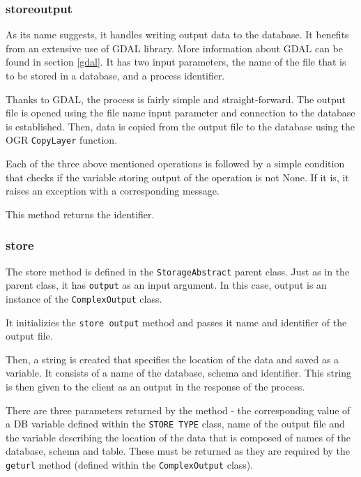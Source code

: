 \subsubsection{\textunderscore store\textunderscore output}

As its name suggests, it handles writing output data to the
database. It benefits from an extensive use of GDAL library. More
information about GDAL can be found in section \ref{gdal}. It has
two input parameters, the name of the file that is to be stored in a
database, and a process identifier.

Thanks to GDAL, the process is fairly simple and straight-forward. The
output file is opened using the file name input parameter and
connection to the database is established. Then, data is copied from
the output file to the database using the OGR \texttt{CopyLayer}
function.

Each of the three above mentioned operations is followed by a simple
condition that checks if the variable storing output of the operation
is not None. If it is, it raises an exception with a corresponding
message.

This method returns the identifier.


\subsubsection{store} 

The store method is defined in the \texttt{StorageAbstract} parent
class. Just as in the parent class, it has \texttt{output} as an input
argument. In this case, output is an instance of the \texttt{ComplexOutput} class.

It initializies the \texttt{\textunderscore store\textunderscore
  output} method and passes it name and identifier of the output file.

Then, a string is created that specifies the location of the data and
saved as a variable. It consists of a name of the database, schema and
identifier. This string is then given to the client as an output in
the  response of the process.

There are three parameters returned by the method - the corresponding
value of a DB variable defined within the \texttt{STORE\textunderscore
  TYPE} class, name of the output file and the variable describing the
location of the data that is composed of names of the database, schema and table.
These must be returned as they are required by
the \texttt{get\textunderscore url} method (defined within the
\texttt{ComplexOutput} class).


